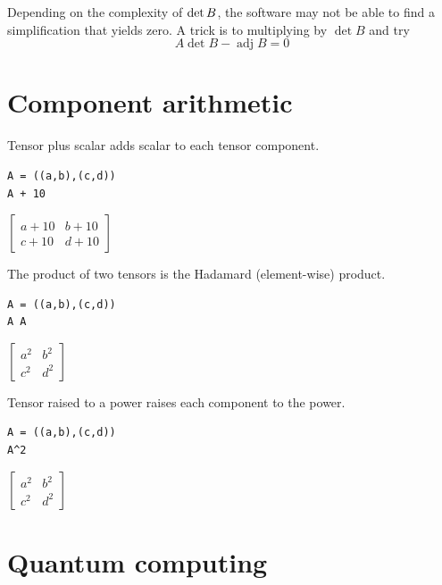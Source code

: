 \documentclass[12pt]{article}
\begin{document}
Depending on the complexity of $\mathop{\rm det}B$, the software
may not be able to find a simplification that yields zero.
A trick is to multiplying by $\operatorname{det}B$ and try
\begin{equation*}
A\operatorname{det}B-\operatorname{adj}B=0
\end{equation*}

\fi

\newpage

\section{Component arithmetic}

Tensor plus scalar adds scalar to each tensor component.

{\color{blue}
\begin{verbatim}
A = ((a,b),(c,d))
A + 10
\end{verbatim}}

$\displaystyle
\begin{bmatrix}
a+10 & b+10
\\[1ex]
c+10 & d+10
\end{bmatrix}
$

\bigskip
The product of two tensors is the Hadamard (element-wise) product.

{\color{blue}
\begin{verbatim}
A = ((a,b),(c,d))
A A
\end{verbatim}}

$\displaystyle
\begin{bmatrix}
a^2 & b^2
\\[1ex]
c^2 & d^2
\end{bmatrix}
$

\bigskip

Tensor raised to a power raises each component to the power.

{\color{blue}
\begin{verbatim}
A = ((a,b),(c,d))
A^2
\end{verbatim}}

$\displaystyle
\begin{bmatrix}
a^2 & b^2
\\[1ex]
c^2 & d^2
\end{bmatrix}
$

\newpage

\section{Quantum computing}
\end{document}
